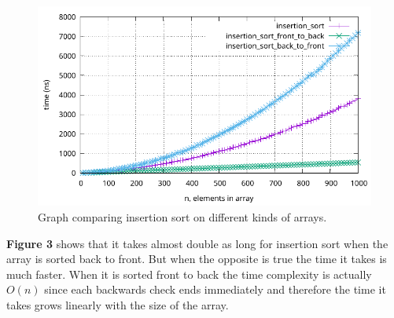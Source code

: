 \documentclass[a4paper, 11pt]{article}
\begin{document}
	\begin{figure}[H]
		\centering
		\includegraphics[scale=0.7]{graphs/insertion_sort_vs_insertion_sort_front_to_back_vs_insertion_sort_back_to_front.pdf}
		\caption{
			Graph comparing insertion sort on different kinds of arrays.
		}
	\end{figure}
	\textbf{Figure 3} shows that it takes almost double as long for insertion sort when the array is sorted back to front.
	But when the opposite is true the time it takes is much faster.
	When it is sorted front to back the time complexity is actually \(O(n)\) since each backwards check ends immediately and therefore
	the time it takes grows linearly with the size of the array.
\end{document}
